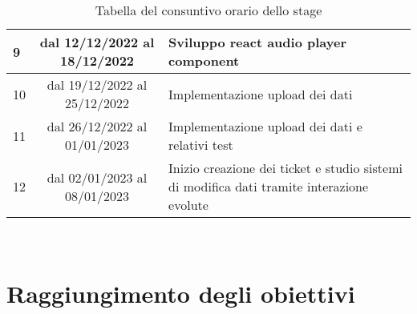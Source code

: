 \begin{table}[H]
\begin{tabularx}{\textwidth}{|l|c|X|}
    \hline
    9               & dal 12/12/2022 al 18/12/2022 & Sviluppo react audio player component                                                     \\
    \hline
    10              & dal 19/12/2022 al 25/12/2022 & Implementazione upload dei dati                                                           \\
    \hline
    11              & dal 26/12/2022 al 01/01/2023 & Implementazione upload dei dati e relativi test                                           \\
    \hline
    12              & dal 02/01/2023 al 08/01/2023 & Inizio creazione dei ticket e studio sistemi di modifica dati tramite interazione evolute \\
    \hline
  \end{tabularx}
  \\
  \label{tab:consuntivo-stage}
  \caption{Tabella del consuntivo orario dello stage}
\end{table}%



\section{Raggiungimento degli obiettivi}
\label{sec:raggiungimento-obiettivi}

